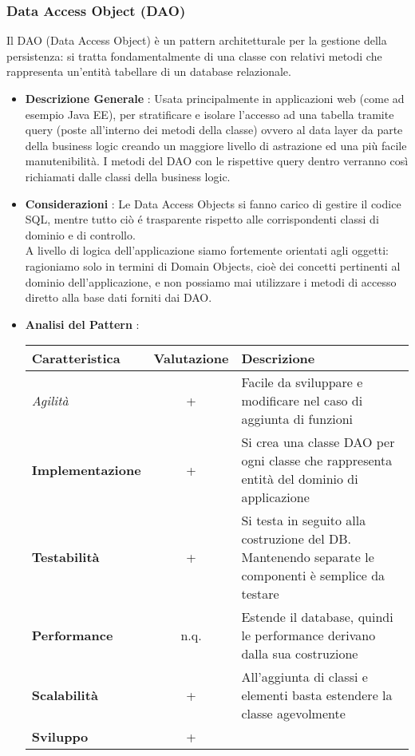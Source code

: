 {{		\subsubsection{Data Access Object (DAO)}{
			Il DAO (Data Access Object) è un pattern architetturale per la gestione della persistenza: si tratta fondamentalmente di una classe con relativi metodi che rappresenta un'entità tabellare di un database relazionale.
			\begin{itemize}\itemsep1pt
				\item \textbf{Descrizione Generale} : Usata principalmente in applicazioni web (come ad esempio Java EE), per stratificare e isolare l'accesso ad una tabella tramite query (poste all'interno dei metodi della classe) ovvero al data layer da parte della business logic creando un maggiore livello di astrazione ed una più facile manutenibilità. I metodi del DAO con le rispettive query dentro verranno così richiamati dalle classi della business logic.
				\item \textbf{Considerazioni} : Le Data Access Objects si fanno carico di gestire il codice SQL, mentre tutto ciò é trasparente rispetto alle corrispondenti classi di dominio e di controllo.\\ 
				A livello di logica dell'applicazione siamo fortemente orientati agli oggetti: ragioniamo solo in termini di Domain Objects, cioè dei concetti pertinenti al dominio dell'applicazione, e non possiamo mai utilizzare i metodi di accesso diretto alla base dati forniti dai DAO. %
				\item \textbf{Analisi del Pattern} :
				\small %
				{\renewcommand\arraystretch{1.2} %
					\begin{tabular}{|l|c|l|}
						\hline
						{\textbf{Caratteristica}}&{\textbf{Valutazione}}&{\textbf{Descrizione}}\\
						\hline
						\textit{Agilità} & + & Facile da sviluppare e modificare nel caso di aggiunta di funzioni \\
						\hline
						\textbf{Implementazione} & + & Si crea una classe DAO per ogni classe che rappresenta entità del dominio di applicazione \\
						\hline
						\textbf{Testabilità} & + & Si testa in seguito alla costruzione del DB. Mantenendo separate le componenti è semplice da testare \\
						\hline
						\textbf{Performance} & n.q. & Estende il database, quindi le performance derivano dalla sua costruzione \\
						\hline
						\textbf{Scalabilità} & + & All'aggiunta di classi e elementi basta estendere la classe agevolmente\\
						\hline
						\textbf{Sviluppo} & + & %
						\hline
					\end{tabular}
				}
			\end{itemize}
		}
	
}}
